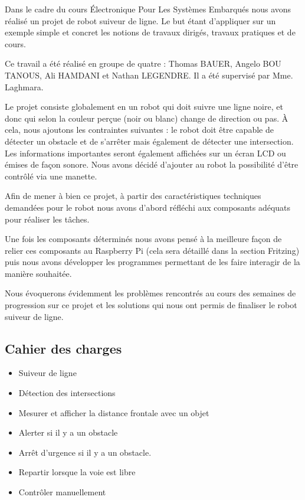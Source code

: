 Dans le cadre du cours Électronique Pour Les Systèmes Embarqués nous avons réalisé un projet de robot suiveur de ligne. Le but étant d'appliquer sur un exemple simple et concret les notions de travaux dirigés, travaux pratiques et de cours.

Ce travail a été réalisé en groupe de quatre : Thomas BAUER, Angelo BOU TANOUS, Ali HAMDANI et Nathan LEGENDRE. Il a été supervisé par Mme. Laghmara.

Le projet consiste globalement en un robot qui doit suivre une ligne noire, et donc qui selon la couleur perçue (noir ou blanc) change de direction ou pas. À cela, nous ajoutons les contraintes suivantes : le robot doit être capable de détecter un obstacle et de s'arrêter mais également de détecter une intersection. Les informations importantes seront également affichées sur un écran LCD ou émises de façon sonore. Nous avons décidé d'ajouter au robot la possibilité d'être contrôlé via une manette.

Afin de mener à bien ce projet, à partir des caractéristiques techniques demandées pour le robot nous avons d'abord réfléchi aux composants adéquats pour réaliser les tâches.

Une fois les composants déterminés nous avons pensé à la meilleure façon de relier ces composants au Raspberry Pi (cela sera détaillé dans la section Fritzing) puis nous avons développer les programmes permettant de les faire interagir de la manière souhaitée.

Nous évoquerons évidemment les problèmes rencontrés au cours des semaines de progression sur ce projet et les solutions qui nous ont permis de finaliser le robot suiveur de ligne.

\subsection*{Cahier des charges}
\begin{itemize}
    \item Suiveur de ligne
    \item Détection des intersections
    \item Mesurer et afficher la distance frontale avec un objet
    \item Alerter si il y a un obstacle
    \item Arrêt d'urgence si il y a un obstacle.
    \item Repartir lorsque la voie est libre
    \item Contrôler manuellement
\end{itemize}

\newpage